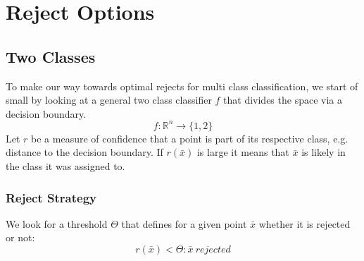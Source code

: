 %
\chapter{Reject Options}
\label{sec:options}

\section{Two Classes}
To make our way towards optimal rejects for multi class classification, we start of small by looking at a general two class classifier $f$ that divides the space via a decision boundary. 
$$ f: \mathbb{R}^n \to \{1,2\} $$
Let $r$ be a measure of confidence that a point is part of its respective class, e.g. distance to the decision boundary. If $r(\bar{x})$ is large it means that $\bar{x}$ is likely in the class it was assigned to.

\subsection{Reject Strategy}
We look for a threshold $\Theta$ that defines for a given point $\bar{x}$ whether it is rejected or not:
$$ r(\bar{x}) < \Theta : \bar{x} \  rejected $$

